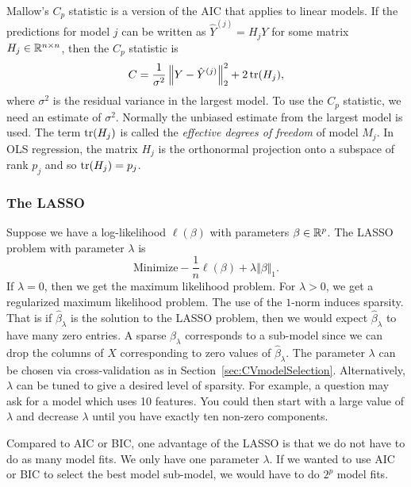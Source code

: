 Mallow's $C_p$ statistic is a version of the AIC that applies to linear models. If the predictions for model $j$ can be written as $\hat{Y}^{(j)} = H_jY$ for some matrix $H_j \in \mathbb{R}^{n \times n}$, then the $C_p$ statistic is 
\[C  = \frac{1}{\sigma^2} \left\Vert Y -\hat{Y}^{(j)} \right\Vert_2^2 + 2\operatorname{tr}(H_j),\]
where $\sigma^2$ is the residual variance in the largest model. To use the $C_p$ statistic, we need an estimate of $\sigma^2$. Normally the unbiased estimate from the largest model is used. The term $\operatorname{tr}(H_j)$ is called the \emph{effective degrees of freedom} of model $M_j$. In OLS regression, the matrix $H_j$ is the orthonormal projection onto a subspace of rank $p_j$ and so $\operatorname{tr}(H_j)=p_j$.

\subsubsection*{The LASSO}

Suppose we have a log-likelihood $\ell(\beta)$ with parameters $\beta \in \mathbb{R}^p$. The LASSO problem with parameter $\lambda$ is
\[\mbox{Minimize} -\frac{1}{n}\ell(\beta) + \lambda \Vert \beta \Vert_1.\]
If $\lambda = 0$, then we get the maximum likelihood problem. For $\lambda > 0$, we get a regularized maximum likelihood problem. The use of the $1$-norm induces sparsity. That is if $\hat{\beta}_\lambda$ is the solution to the LASSO problem, then we would expect $\hat{\beta}_\lambda$ to have many zero entries. A sparse $\hat{\beta}_\lambda$ corresponds to a sub-model since we can drop the columns of $X$ corresponding to zero values of $\hat{\beta}_\lambda$. The parameter $\lambda$ can be chosen via cross-validation as in Section~\ref{sec:CVmodelSelection}. Alternatively, $\lambda$ can be tuned to give a desired level of sparsity. For example, a question may ask for a model which uses 10 features. You could then start with a large value of $\lambda$ and decrease $\lambda$ until you have exactly ten non-zero components.

Compared to AIC or BIC, one advantage of the LASSO is that we do not have to do as many model fits. We only have one parameter $\lambda$. If we wanted to use AIC or BIC to select the best model sub-model, we would have to do $2^p$ model fits. 


